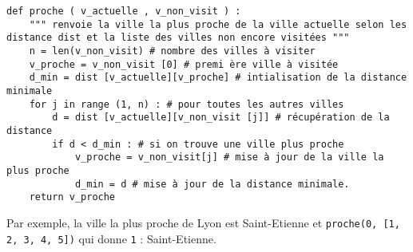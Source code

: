 \ifprof
\begin{corrige}
\begin{lstlisting}
def proche ( v_actuelle , v_non_visit ) :
    """ renvoie la ville la plus proche de la ville actuelle selon les distance dist et la liste des villes non encore visitées """
    n = len(v_non_visit) # nombre des villes à visiter
    v_proche = v_non_visit [0] # premi ère ville à visitée
    d_min = dist [v_actuelle][v_proche] # intialisation de la distance minimale
    for j in range (1, n) : # pour toutes les autres villes
        d = dist [v_actuelle][v_non_visit [j]] # récupération de la distance
        if d < d_min : # si on trouve une ville plus proche
            v_proche = v_non_visit[j] # mise à jour de la ville la plus proche
            d_min = d # mise à jour de la distance minimale.
    return v_proche
\end{lstlisting}
\end{corrige}
\else
\fi

\begin{exemple}
Par exemple, la ville la plus proche de Lyon est Saint-Etienne et \lstinline{proche(0, [1, 2, 3, 4, 5])} qui donne \lstinline{1} : Saint-Etienne.
\end{exemple}

